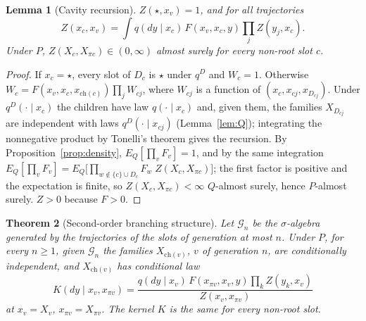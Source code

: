 \documentclass[11pt]{article}
\theoremstyle{plain}
\newtheorem{theorem}{Theorem}
\newtheorem{lemma}[theorem]{Lemma}
\theoremstyle{definition}
\theoremstyle{remark}
\begin{document}
\begin{lemma}[Cavity recursion]\label{lem:cavity}
$Z(\star,x_v)=1$, and for all trajectories
\[
Z(x_c,x_v)=\int q(dy\mid x_c)\,F(x_v,x_c,y)\prod_jZ(y_j,x_c).
\]
Under $P$, $Z(X_c,X_{\pi c})\in(0,\infty)$ almost surely for every non-root slot $c$.
\end{lemma}

\begin{proof}
If $x_c=\star$, every slot of $D_c$ is $\star$ under $q^D$ and $W_c=1$. Otherwise $W_c=F(x_v,x_c,x_{\mathrm{ch}(c)})\prod_jW_{cj}$, where $W_{cj}$ is a function of $(x_c,x_{cj},x_{D_{cj}})$. Under $q^D(\cdot\mid x_c)$ the children have law $q(\cdot\mid x_c)$ and, given them, the families $X_{D_{cj}}$ are independent with laws $q^D(\cdot\mid x_{cj})$ (Lemma~\ref{lem:Q}); integrating the nonnegative product by Tonelli's theorem gives the recursion. By Proposition~\ref{prop:density}, $E_Q[\prod_vF_v]=1$, and by the same integration $E_Q[\prod_vF_v]=E_Q\bigl[\prod_{w\notin\{c\}\cup D_c}F_w\;Z(X_c,X_{\pi c})\bigr]$; the first factor is positive and the expectation is finite, so $Z(X_c,X_{\pi c})<\infty$ $Q$-almost surely, hence $P$-almost surely. $Z>0$ because $F>0$.
\end{proof}

\begin{theorem}[Second-order branching structure]\label{prop:subtree}
Let $\mathcal G_n$ be the $\sigma$-algebra generated by the trajectories of the slots of generation at most $n$. Under $P$, for every $n\ge1$, given $\mathcal G_n$ the families $X_{\mathrm{ch}(v)}$, $v$ of generation $n$, are conditionally independent, and $X_{\mathrm{ch}(v)}$ has conditional law
\[
K(dy\mid x_v,x_{\pi v})=\frac{q(dy\mid x_v)\,F(x_{\pi v},x_v,y)\prod_kZ(y_k,x_v)}{Z(x_v,x_{\pi v})}
\]
at $x_v=X_v$, $x_{\pi v}=X_{\pi v}$. The kernel $K$ is the same for every non-root slot.
\end{theorem}
\end{document}

